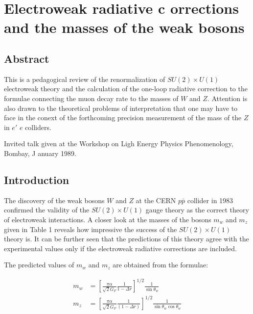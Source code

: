 \chapter{Electroweak radiative c orrections and the masses of the weak bosons }\label{chap24}



\section*{Abstract}

This is a pedagogical review of the renormalization of $SU(2) \times U(1)$
electroweak theory and the calculation of the one-loop radiative correction
to the formulae connecting the muon decay rate to the masses of $W$ and
$Z$. Attention is also drawn to the theoretical problems of interpretation
that one may have to face in the conext of the forthcoming precision
measurement of the mass of the $Z$ in $e'$ $e$ colliders. 

Invited talk given at the Workshop on Ligh Energy Physics
Phenomenology, Bombay, J anuary 1989. 

\section{Introduction}

The discovery of the weak bosons $W$ and $Z$ at the CERN $p\bar{p}$ collider in 1983
confirmed the validity of the $SU(2) \times U(1)$ gauge theory as the correct theory of
electroweak interactions. A closer look at the masses of the bosons $m_{w}$ and $m_{z}$
given in Table 1 reveals how impressive the success of the  $SU(2) \times U(1)$ theory
is. It can be further seen that the predictions of this theory agree with the
experimental values only if the electroweak radiative corrections are included. 

The predicted values of $m_{w}$ and $m_{z}$ are obtained from the formulae: 

\begin{align}
m_{w} &= \left[\frac{\pi \alpha}{ \sqrt{2} G_{F}} \frac{1}{1-\Delta r}\right]^{1/2}\frac{1}{\sin \theta_{w}}\tag{1.1}\\
m_{z} &= \left[\frac{\pi \alpha}{\sqrt{2}{G_{F}}} \frac{1}{(1-\Delta r)}\right]^{1/2} \frac{1}{\sin \theta_{w} \cos \theta_{w}}\tag{1.2}
\end{align}

